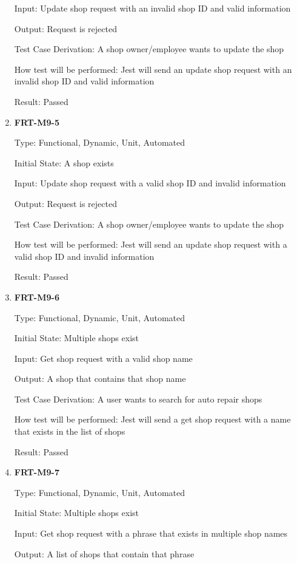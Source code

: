 \documentclass[12pt, titlepage]{article}
\begin{document}
\begin{enumerate}
	      Input: Update shop request with an invalid shop ID and valid information

	      Output: Request is rejected

	      Test Case Derivation: A shop owner/employee wants to update the shop

	      How test will be performed: Jest will send an update shop request with an invalid shop ID and valid
	      information

	      Result: Passed

	\item \textbf{FRT-M9-5}

	      Type: Functional, Dynamic, Unit, Automated

	      Initial State: A shop exists

	      Input: Update shop request with a valid shop ID and invalid information

	      Output: Request is rejected

	      Test Case Derivation: A shop owner/employee wants to update the shop

	      How test will be performed: Jest will send an update shop request with a valid shop ID and invalid
	      information

	      Result: Passed

	\item \textbf{FRT-M9-6}

	      Type: Functional, Dynamic, Unit, Automated

	      Initial State: Multiple shops exist

	      Input: Get shop request with a valid shop name

	      Output: A shop that contains that shop name

	      Test Case Derivation: A user wants to search for auto repair shops

	      How test will be performed: Jest will send a get shop request with a name that exists in the list
	      of shops

	      Result: Passed

	\item \textbf{FRT-M9-7}

	      Type: Functional, Dynamic, Unit, Automated

	      Initial State: Multiple shops exist

	      Input: Get shop request with a phrase that exists in multiple shop names

	      Output: A list of shops that contain that phrase


\end{enumerate}
\end{document}
